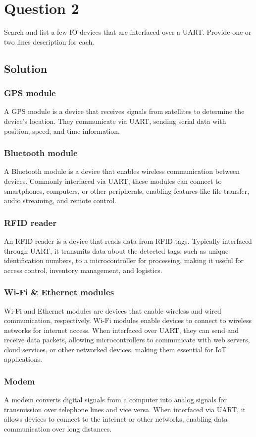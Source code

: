 \section*{Question 2}

Search and list a few IO devices that are interfaced over a UART.\@
Provide one or two lines description for each.

\subsection*{Solution}

\subsubsection*{GPS module}

A GPS module is a device that receives signals from satellites to determine the device's location.
They communicate via UART, sending serial data with position, speed, and time information.

\subsubsection*{Bluetooth module}

A Bluetooth module is a device that enables wireless communication between devices.
Commonly interfaced via UART, these modules can connect to smartphones, computers, or other peripherals, enabling features like file transfer, audio streaming, and remote control.

\subsubsection*{RFID reader}

An RFID reader is a device that reads data from RFID tags.
Typically interfaced through UART, it transmits data about the detected tags, such as unique identification numbers, to a microcontroller for processing, making it useful for access control, inventory management, and logistics.

\subsubsection*{Wi-Fi \& Ethernet modules}

Wi-Fi and Ethernet modules are devices that enable wireless and wired communication, respectively.
Wi-Fi modules enable devices to connect to wireless networks for internet access. When interfaced over UART, they can send and receive data packets, allowing microcontrollers to communicate with web servers, cloud services, or other networked devices, making them essential for IoT applications.

\subsubsection*{Modem}

A modem converts digital signals from a computer into analog signals for transmission over telephone lines and vice versa.
When interfaced via UART, it allows devices to connect to the internet or other networks, enabling data communication over long distances.
